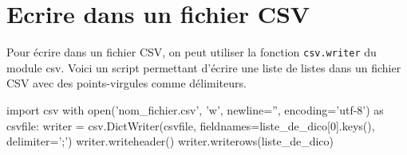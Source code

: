 \section{Ecrire dans un fichier CSV}

Pour écrire dans un fichier CSV, on peut utiliser la fonction \verb|csv.writer| du module csv. Voici un script permettant d'écrire une liste de listes dans un fichier CSV avec des points-virgules comme délimiteurs.	
\begin{CodePythontexAlt}[Largeur=1\linewidth,Centre,PremLigne=1, lineNumbers=false]{}
import csv	
with open('nom_fichier.csv', 'w', newline='', encoding='utf-8') as csvfile:
	writer = csv.DictWriter(csvfile, fieldnames=liste_de_dico[0].keys(), delimiter=';')
	writer.writeheader()
	writer.writerows(liste_de_dico)
\end{CodePythontexAlt}
